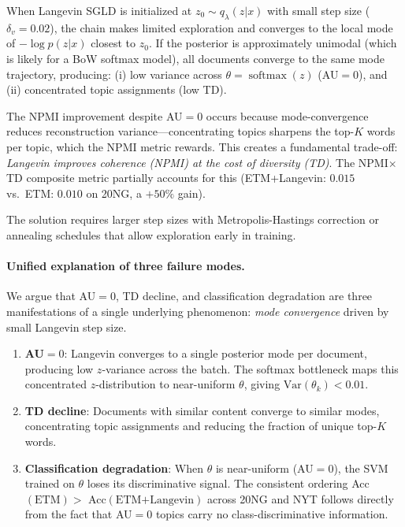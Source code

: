\documentclass[10pt]{article}
\DeclareMathOperator{\softmax}{softmax}
\begin{document}
When Langevin SGLD is initialized at $z_0 \sim q_\lambda(z|x)$ with small step size
($\delta_v = 0.02$), the chain makes limited exploration and converges to the
local mode of $-\log p(z|x)$ closest to $z_0$.
If the posterior is approximately unimodal (which is likely for a BoW softmax model),
all documents converge to the same mode trajectory, producing:
(i) low variance across $\theta = \softmax(z)$ (AU$=0$), and
(ii) concentrated topic assignments (low TD).

The NPMI improvement despite AU$=0$ occurs because mode-convergence reduces
reconstruction variance---concentrating topics sharpens the top-$K$ words per topic,
which the NPMI metric rewards. This creates a fundamental trade-off:
\emph{Langevin improves coherence (NPMI) at the cost of diversity (TD)}.
The NPMI$\times$TD composite metric partially accounts for this
(ETM+Langevin: $0.015$ vs.\ ETM: $0.010$ on 20NG, a $+50\%$ gain).

The solution requires larger step sizes with Metropolis-Hastings correction or
annealing schedules that allow exploration early in training.

\paragraph{Unified explanation of three failure modes.}
We argue that AU$=0$, TD decline, and classification degradation are three manifestations
of a single underlying phenomenon: \emph{mode convergence} driven by small Langevin step size.

\begin{enumerate}
    \item \textbf{AU$=0$}: Langevin converges to a single posterior mode per document,
    producing low $z$-variance across the batch. The softmax bottleneck maps this
    concentrated $z$-distribution to near-uniform $\theta$, giving $\mathrm{Var}(\theta_k) < 0.01$.
    \item \textbf{TD decline}: Documents with similar content converge to similar modes,
    concentrating topic assignments and reducing the fraction of unique top-$K$ words.
    \item \textbf{Classification degradation}: When $\theta$ is near-uniform (AU$=0$),
    the SVM trained on $\theta$ loses its discriminative signal. The consistent ordering
    Acc$(\text{ETM}) >$ Acc$(\text{ETM+Langevin})$ across 20NG and NYT follows directly
    from the fact that AU$=0$ topics carry no class-discriminative information.
\end{enumerate}
\end{document}
